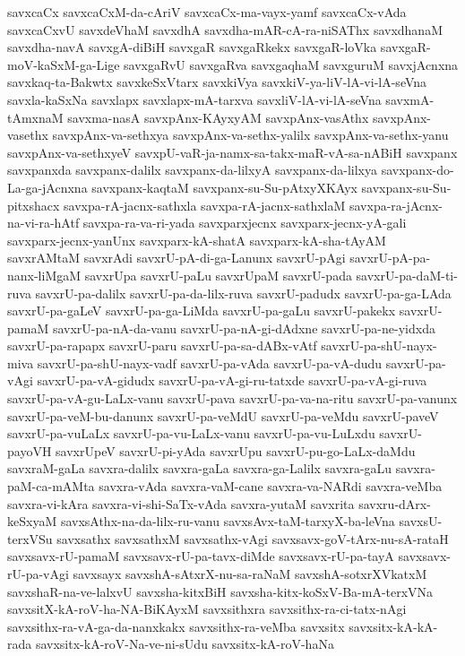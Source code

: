 {savxcaCx
savxcaCxM-da-cAriV
savxcaCx-ma-vayx-yamf
savxcaCx-vAda
savxcaCxvU
savxdeVhaM
savxdhA
savxdha-mAR-cA-ra-niSAThx
savxdhanaM
savxdha-navA
savxgA-diBiH
savxgaR
savxgaRkekx
savxgaR-loVka
savxgaR-moV-kaSxM-ga-Lige
savxgaRvU
savxgaRva
savxgaqhaM
savxguruM
savxjAcnxna
savxkaq-ta-Bakwtx
savxkeSxVtarx
savxkiVya
savxkiV-ya-liV-lA-vi-lA-seVna
savxla-kaSxNa
savxlapx
savxlapx-mA-tarxva
savxliV-lA-vi-lA-seVna
savxmA-tAmxnaM
savxma-nasA
savxpAnx-KAyxyAM
savxpAnx-vasAthx
savxpAnx-vasethx
savxpAnx-va-sethxya
savxpAnx-va-sethx-yalilx
savxpAnx-va-sethx-yanu
savxpAnx-va-sethxyeV
savxpU-vaR-ja-namx-sa-takx-maR-vA-sa-nABiH
savxpanx
savxpanxda
savxpanx-dalilx
savxpanx-da-lilxyA
savxpanx-da-lilxya
savxpanx-do-La-ga-jAcnxna
savxpanx-kaqtaM
savxpanx-su-Su-pAtxyXKAyx
savxpanx-su-Su-pitxshacx
savxpa-rA-jacnx-sathxla
savxpa-rA-jacnx-sathxlaM
savxpa-ra-jAcnx-na-vi-ra-hAtf
savxpa-ra-va-ri-yada
savxparxjecnx
savxparx-jecnx-yA-gali
savxparx-jecnx-yanUnx
savxparx-kA-shatA
savxparx-kA-sha-tAyAM
savxrAMtaM
savxrAdi
savxrU-pA-di-ga-Lanunx
savxrU-pAgi
savxrU-pA-pa-nanx-liMgaM
savxrUpa
savxrU-paLu
savxrUpaM
savxrU-pada
savxrU-pa-daM-ti-ruva
savxrU-pa-dalilx
savxrU-pa-da-lilx-ruva
savxrU-padudx
savxrU-pa-ga-LAda
savxrU-pa-gaLeV
savxrU-pa-ga-LiMda
savxrU-pa-gaLu
savxrU-pakekx
savxrU-pamaM
savxrU-pa-nA-da-vanu
savxrU-pa-nA-gi-dAdxne
savxrU-pa-ne-yidxda
savxrU-pa-rapapx
savxrU-paru
savxrU-pa-sa-dABx-vAtf
savxrU-pa-shU-nayx-miva
savxrU-pa-shU-nayx-vadf
savxrU-pa-vAda
savxrU-pa-vA-dudu
savxrU-pa-vAgi
savxrU-pa-vA-gidudx
savxrU-pa-vA-gi-ru-tatxde
savxrU-pa-vA-gi-ruva
savxrU-pa-vA-gu-LaLx-vanu
savxrU-pava
savxrU-pa-va-na-ritu
savxrU-pa-vanunx
savxrU-pa-veM-bu-danunx
savxrU-pa-veMdU
savxrU-pa-veMdu
savxrU-paveV
savxrU-pa-vuLaLx
savxrU-pa-vu-LaLx-vanu
savxrU-pa-vu-LuLxdu
savxrU-payoVH
savxrUpeV
savxrU-pi-yAda
savxrUpu
savxrU-pu-go-LaLx-daMdu
savxraM-gaLa
savxra-dalilx
savxra-gaLa
savxra-ga-Lalilx
savxra-gaLu
savxra-paM-ca-mAMta
savxra-vAda
savxra-vaM-cane
savxra-va-NARdi
savxra-veMba
savxra-vi-kAra
savxra-vi-shi-SaTx-vAda
savxra-yutaM
savxrita
savxru-dArx-keSxyaM
savxsAthx-na-da-lilx-ru-vanu
savxsAvx-taM-tarxyX-ba-leVna
savxsU-terxVSu
savxsathx
savxsathxM
savxsathx-vAgi
savxsavx-goV-tArx-nu-sA-rataH
savxsavx-rU-pamaM
savxsavx-rU-pa-tavx-diMde
savxsavx-rU-pa-tayA
savxsavx-rU-pa-vAgi
savxsayx
savxshA-sAtxrX-nu-sa-raNaM
savxshA-sotxrXVkatxM
savxshaR-na-ve-lalxvU
savxsha-kitxBiH
savxsha-kitx-koSxV-Ba-mA-terxVNa
savxsitX-kA-roV-ha-NA-BiKAyxM
savxsithxra
savxsithx-ra-ci-tatx-nAgi
savxsithx-ra-vA-ga-da-nanxkakx
savxsithx-ra-veMba
savxsitx
savxsitx-kA-kA-rada
savxsitx-kA-roV-Na-ve-ni-sUdu
savxsitx-kA-roV-haNa
}
